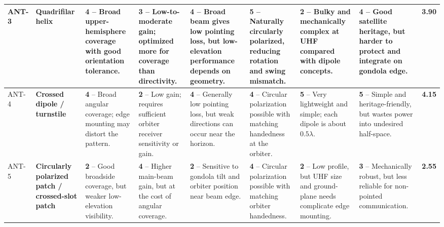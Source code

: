 \begin{longtable}{|p{}|p{}|p{}|p{}|p{}|p{}|p{}|p{}|p{}|}
ANT-3 &
\textbf{Quadrifilar helix} &
\cellcolor{score4!40}\textbf{4} -- Broad upper-hemisphere coverage with good orientation tolerance. &
\cellcolor{score3!40}\textbf{3} -- Low-to-moderate gain; optimized more for coverage than directivity. &
\cellcolor{score4!40}\textbf{4} -- Broad beam gives low pointing loss, but low-elevation performance depends on geometry. &
\cellcolor{score5!40}\textbf{5} -- Naturally circularly polarized, reducing rotation and swing mismatch. &
\cellcolor{score2!40}\textbf{2} -- Bulky and mechanically complex at UHF compared with dipole concepts. &
\cellcolor{score4!40}\textbf{4} -- Good satellite heritage, but harder to protect and integrate on gondola edge. &
\cellcolor{score4!40}\textbf{3.90} \\
\hline

ANT-4 &
\textbf{Crossed dipole / turnstile} &
\cellcolor{score4!40}\textbf{4} -- Broad angular coverage; edge mounting may distort the pattern. &
\cellcolor{score2!40}\textbf{2} -- Low gain; requires sufficient orbiter receiver sensitivity or gain. &
\cellcolor{score4!40}\textbf{4} -- Generally low pointing loss, but weak directions can occur near the horizon. &
\cellcolor{score4!40}\textbf{4} -- Circular polarization possible with matching handedness at the orbiter. &
\cellcolor{score5!40}\textbf{5} -- Very lightweight and simple; each dipole is about $0.5\lambda$. &
\cellcolor{score5!40}\textbf{5} -- Simple and heritage-friendly, but wastes power into undesired half-space. &
\cellcolor{score4!40}\textbf{4.15} \\
\hline

ANT-5 &
\textbf{Circularly polarized patch / crossed-slot patch} &
\cellcolor{score2!40}\textbf{2} -- Good broadside coverage, but weaker low-elevation visibility. &
\cellcolor{score4!40}\textbf{4} -- Higher main-beam gain, but at the cost of angular coverage. &
\cellcolor{score2!40}\textbf{2} -- Sensitive to gondola tilt and orbiter position near beam edge. &
\cellcolor{score4!40}\textbf{4} -- Circular polarization possible with matching orbiter handedness. &
\cellcolor{score2!40}\textbf{2} -- Low profile, but UHF size and ground-plane needs complicate edge mounting. &
\cellcolor{score3!40}\textbf{3} -- Mechanically robust, but less reliable for non-pointed communication. &
\cellcolor{score3!40}\textbf{2.55} \\
\hline


\end{longtable}
